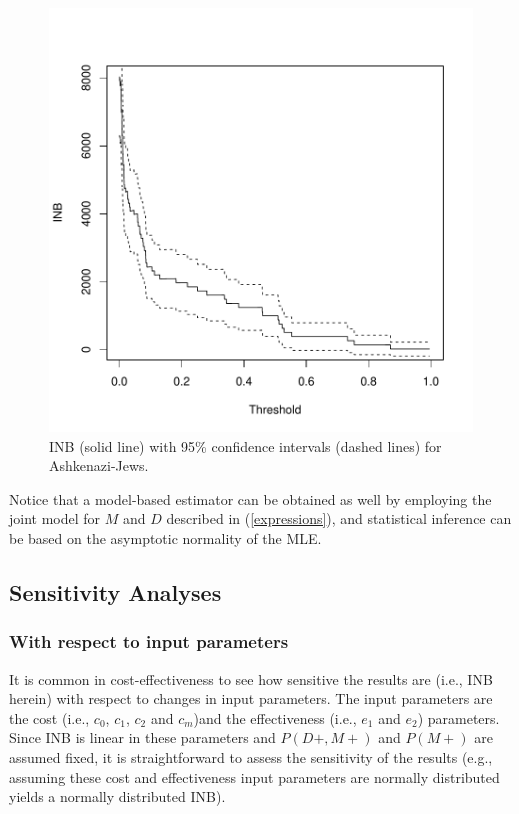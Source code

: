 \documentclass[11pt]{article}
\begin{document}
\begin{figure}
\begin{center}
\includegraphics{Screening_biomarker_07142018-fig3}
\end{center}
\label{fig:three}
\caption{INB (solid line) with 95\% confidence intervals (dashed lines) for Ashkenazi-Jews.}
\end{figure}


Notice that a model-based estimator can be obtained as well by employing the joint model for $M$ and $D$ described in (\ref{expressions}), and statistical inference can be based on the asymptotic normality of the MLE.

\subsection{Sensitivity Analyses}

\subsubsection{With respect to input parameters}

It is common in cost-effectiveness to see how sensitive the results are (i.e., INB herein) with respect to changes in input parameters. The input parameters are the cost (i.e., $c_0$, $c_1$, $c_2$ and $c_m$)and the effectiveness (i.e., $e_1$ and $e_2$) parameters. Since INB is linear in these parameters and $P(D+,M+)$ and $P(M+)$ are assumed fixed, it is straightforward to assess the sensitivity of the results (e.g., assuming these cost and effectiveness input parameters are normally distributed yields a normally distributed INB).
\end{document}

